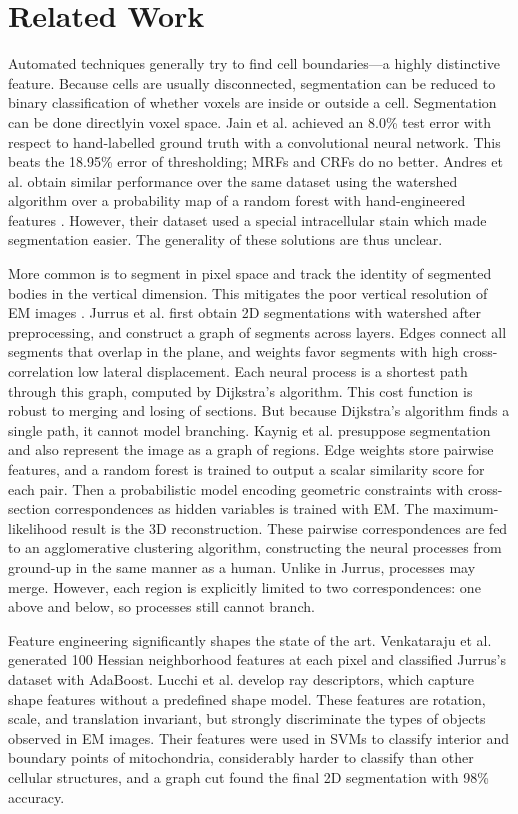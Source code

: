 \documentclass[english]{article}
\newcommand{\+}[1]{\ensuremath{\boldsymbol{\mathrm{#1}}}}
\begin{document}
\section{Related Work}
Automated techniques generally try to find cell boundaries---a highly distinctive feature. Because cells are usually disconnected, segmentation can be reduced to binary classification of whether voxels are inside or outside a cell. Segmentation can be done directlyin voxel space. Jain et al. \cite{Jain2007} achieved an 8.0\% test error with respect to hand-labelled ground truth with a convolutional neural network. This beats the 18.95\% error of thresholding; MRFs and CRFs do no better. Andres et al. obtain similar performance over the same dataset using the watershed algorithm over a probability map of a random forest with hand-engineered features \cite{Andres2008}. However, their dataset used a special intracellular stain which made segmentation easier. The generality of these solutions are thus unclear.

More common is to segment in pixel space and track the identity of segmented bodies in the vertical dimension. This mitigates the poor vertical resolution of EM images \cite{Kaynig2010, Briggman2006}. Jurrus et al. \cite{Jurrus2008} first obtain 2D segmentations with watershed after preprocessing, and construct a graph of segments across layers. Edges connect all segments that overlap in the plane, and weights favor segments with high cross-correlation low lateral displacement. Each neural process is a shortest path through this graph, computed by Dijkstra's algorithm. This cost function is robust to merging and losing of sections. But because Dijkstra's algorithm finds a single path, it cannot model branching. Kaynig et al. \cite{Kaynig2010a} presuppose segmentation and also represent the image as a graph of regions. Edge weights store pairwise features, and a random forest is trained to output a scalar similarity score for each pair. Then a probabilistic model encoding geometric constraints with cross-section correspondences as hidden variables is trained with EM. The maximum-likelihood result is the 3D reconstruction. These pairwise correspondences are fed to an agglomerative clustering algorithm, constructing the neural processes from ground-up in the same manner as a human. Unlike in Jurrus, processes may merge. However, each region is explicitly limited to two correspondences: one above and below, so processes still cannot branch.

Feature engineering significantly shapes the state of the art. Venkataraju et al. \cite{Venkataraju2009} generated 100 Hessian neighborhood features at each pixel and classified Jurrus's dataset with AdaBoost. Lucchi et al. \cite{Lucchi2010} develop ray descriptors, which capture shape features without a predefined shape model. These features are rotation, scale, and translation invariant, but strongly discriminate the types of objects observed in EM images. Their features were used in SVMs to classify interior and boundary points of mitochondria, considerably harder to classify than other cellular structures, and a graph cut found the final 2D segmentation with 98\% accuracy.
\end{document}
